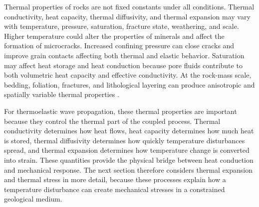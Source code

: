 Thermal properties of rocks are not fixed constants under all conditions. Thermal conductivity, heat capacity, thermal diffusivity, and thermal expansion may vary with temperature, pressure, saturation, fracture state, weathering, and scale. Higher temperature could alter the properties of minerals and affect the formation of microcracks.
Increased confining pressure can close cracks and improve grain contacts affecting both thermal and elastic behavior. Saturation may affect heat storage and heat conduction because pore fluids contribute to both volumetric heat capacity and effective conductivity. At the rock-mass scale, bedding, foliation, fractures, and lithological layering can produce anisotropic and spatially variable thermal properties \cite{robertson1988,mavko2009,turcotte2014}.

For thermoelastic wave propagation, these thermal properties are important because they control the thermal part of the coupled process. Thermal conductivity determines how heat flows, heat capacity determines how much heat is stored, thermal diffusivity determines how quickly temperature disturbances spread, and thermal expansion determines how temperature change is converted into strain. These quantities provide the physical bridge between heat conduction and mechanical response. The next section therefore considers thermal expansion and thermal stress in more detail, because these processes explain how a temperature disturbance can create mechanical stresses in a constrained geological medium.